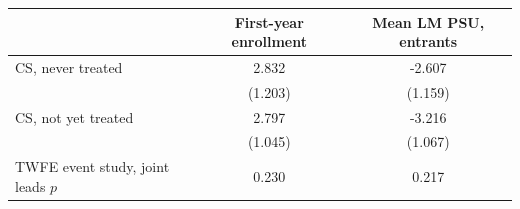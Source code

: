 \begin{tabular}{lcc}
\toprule
 & First-year enrollment & Mean LM PSU, entrants \\
\midrule
CS, never treated & 2.832 & -2.607 \\
 & (1.203) & (1.159) \\
CS, not yet treated & 2.797 & -3.216 \\
 & (1.045) & (1.067) \\
TWFE event study, joint leads \(p\) & 0.230 & 0.217 \\
\bottomrule
\end{tabular}
